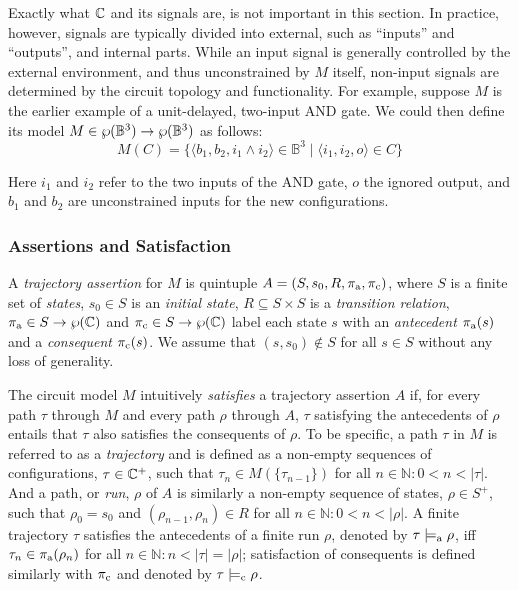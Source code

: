 
Exactly what $\mathbb{C}$ and its signals are, is not important in this section. In practice, however, signals are typically divided into external, such as ``inputs'' and ``outputs'', and internal parts. While an input signal is generally controlled by the external environment, and thus unconstrained by $M$ itself, non-input signals are determined by the circuit topology and functionality. For example, suppose $M$ is the earlier example of a unit-delayed, two-input AND gate. We could then define its model $M \in \wp(\mathbb{B}^{3}) \rightarrow \wp(\mathbb{B}^{3})$ as follows:
%
\begin{equation*}
M(C) = \{ \langle b_{1}, b_{2}, i_{1} \wedge i_{2} \rangle \in \mathbb{B}^{3} \mid \langle i_{1}, i_{2}, o \rangle \in C \}
\end{equation*}

\noindent Here $i_{1}$ and $i_{2}$ refer to the two inputs of the AND gate, $o$ the ignored output, and $b_{1}$ and $b_{2}$ are unconstrained inputs for the new configurations.

\subsubsection{Assertions and Satisfaction} \label{sec:set-ste-sat}

A \textit{trajectory assertion} for $M$ is quintuple $A = (S, s_{0}, R, \operatorname{\pi_{\textrm{a}}}, \operatorname{\pi_{\textrm{c}}})$, where $S$ is a finite set of \textit{states}, $s_{0} \in S$ is an \textit{initial state}, $R \subseteq S \times S$ is a \textit{transition relation}, $\operatorname{\pi_{\textrm{a}}} \in S \rightarrow \wp(\mathbb{C})$ and $\operatorname{\pi_{\textrm{c}}} \in S \rightarrow \wp(\mathbb{C})$ label each state $s$ with an \textit{antecedent} $\operatorname{\pi_{\textrm{a}}}(s)$ and a \textit{consequent} $\operatorname{\pi_{\textrm{c}}}(s)$. We assume that $(s,s_{0}) \notin S$ for all $s \in S$ without any loss of generality.

The circuit model $M$ intuitively \textit{satisfies} a trajectory assertion $A$ if, for every path $\tau$ through $M$ and every path $\rho$ through $A$, $\tau$ satisfying the antecedents of $\rho$ entails that $\tau$ also satisfies the consequents of $\rho$. To be specific, a path $\tau$ in $M$ is referred to as a \textit{trajectory} and is defined as a non-empty sequences of configurations, $\tau \in \mathbb{C}^{+}$, such that $\tau_{n} \in M(\{ \tau_{n-1} \})$ for all $n \in \mathbb{N} : 0 < n < | \tau |$. And a path, or \textit{run}, $\rho$ of $A$ is similarly a non-empty sequence of states, $\rho \in S^{+}$, such that $\rho_{0} = s_{0}$ and $(\rho_{n-1}, \rho_{n}) \in R$ for all $n \in \mathbb{N} : 0 < n < | \rho |$. A finite trajectory $\tau$ satisfies the antecedents of a finite run $\rho$, denoted by $\tau \models_{\textrm{a}} \rho$, iff $\tau_{n} \in \operatorname{\pi_{\textrm{a}}}(\rho_{n})$ for all $n \in \mathbb{N} : n < | \tau | = | \rho |$; satisfaction of consequents is defined similarly with $\operatorname{\pi_{\textrm{c}}}$ and denoted by $\tau \models_{\textrm{c}} \rho$.

